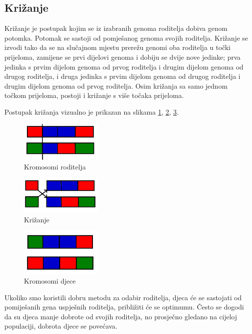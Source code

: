 \documentclass[times, utf8, zavrsni, numeric]{fer}
\begin{document}
\subsection{Križanje}
Križanje je postupak kojim se iz izabranih genoma roditelja dobiva genom potomka. Potomak se sastoji od pomješanog genoma svojih roditelja. Križanje se izvodi tako da se na slučajnom mjestu prerežu genomi oba roditelja u točki prijeloma, zamijene se prvi dijelovi genoma i dobiju se dvije nove jedinke; prva jedinka s prvim dijelom genoma od prvog roditelja i drugim dijelom genoma od drugog roditelja, i druga jedinka s prvim dijelom genoma od drugog roditelja i drugim dijelom genoma od prvog roditelja. Osim križanja sa samo jednom točkom prijeloma, postoji i križanje s više točaka prijeloma. 

Postupak križanja vizualno je prikazan na slikama \ref{fig:kromosomi roditelja}, \ref{fig:krizanje}, \ref{fig:kromosomi djece}.

\begin{figure}[htb]
\centering
\includegraphics[width=4cm]{images/kromosomi_roditelja.png}
\caption{Kromosomi roditelja}
\label{fig:kromosomi roditelja}
\end{figure}

\begin{figure}[htb]
\centering
\includegraphics[width=4cm]{images/krizanje.png}
\caption{Križanje}
\label{fig:krizanje}
\end{figure}

\begin{figure}[htb]
\centering
\includegraphics[width=4cm]{images/kromosomi_djece.png}
\caption{Kromosomi djece}
\label{fig:kromosomi djece}
\end{figure}

Ukoliko smo koristili dobru metodu za odabir roditelja, djeca će se sastojati od pomiješanih gena uspješnih roditelja, približiti će se optimumu. Često se dogodi da su djeca manje dobrote od svojih roditelja, no prosječno gledano na cijeloj populaciji, dobrota djece se povećava.
\end{document}
